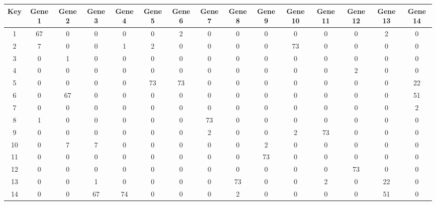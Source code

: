 \begin{tabular}{|c|c|c|c|c|c|c|c|c|c|c|c|c|c|c|}
\hline
Key & Gene 1 & Gene 2 & Gene 3 & Gene 4 & Gene 5 & Gene 6 & Gene 7 & Gene 8 & Gene 9 & Gene 10 & Gene 11 & Gene 12 & Gene 13 & Gene 14 \\
\hline
1 & 67 & 0 & 0 & 0 & 0 & 2 & 0 & 0 & 0 & 0 & 0 & 0 & 2 & 0 \\
2 & 7 & 0 & 0 & 1 & 2 & 0 & 0 & 0 & 0 & 73 & 0 & 0 & 0 & 0 \\
3 & 0 & 1 & 0 & 0 & 0 & 0 & 0 & 0 & 0 & 0 & 0 & 0 & 0 & 0 \\
4 & 0 & 0 & 0 & 0 & 0 & 0 & 0 & 0 & 0 & 0 & 0 & 2 & 0 & 0 \\
5 & 0 & 0 & 0 & 0 & 73 & 73 & 0 & 0 & 0 & 0 & 0 & 0 & 0 & 22 \\
6 & 0 & 67 & 0 & 0 & 0 & 0 & 0 & 0 & 0 & 0 & 0 & 0 & 0 & 51 \\
7 & 0 & 0 & 0 & 0 & 0 & 0 & 0 & 0 & 0 & 0 & 0 & 0 & 0 & 2 \\
8 & 1 & 0 & 0 & 0 & 0 & 0 & 73 & 0 & 0 & 0 & 0 & 0 & 0 & 0 \\
9 & 0 & 0 & 0 & 0 & 0 & 0 & 2 & 0 & 0 & 2 & 73 & 0 & 0 & 0 \\
10 & 0 & 7 & 7 & 0 & 0 & 0 & 0 & 0 & 2 & 0 & 0 & 0 & 0 & 0 \\
11 & 0 & 0 & 0 & 0 & 0 & 0 & 0 & 0 & 73 & 0 & 0 & 0 & 0 & 0 \\
12 & 0 & 0 & 0 & 0 & 0 & 0 & 0 & 0 & 0 & 0 & 0 & 73 & 0 & 0 \\
13 & 0 & 0 & 1 & 0 & 0 & 0 & 0 & 73 & 0 & 0 & 2 & 0 & 22 & 0 \\
14 & 0 & 0 & 67 & 74 & 0 & 0 & 0 & 2 & 0 & 0 & 0 & 0 & 51 & 0 \\
\hline
\end{tabular}